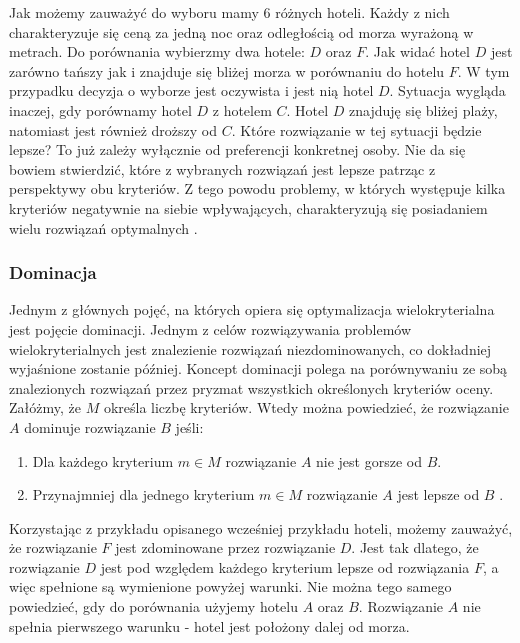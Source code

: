 \documentclass[twoside]{iisthesis}
\begin{document}
Jak możemy zauważyć do wyboru mamy 6 różnych hoteli. Każdy z nich charakteryzuje się ceną za jedną noc oraz odległością od morza wyrażoną w metrach. Do porównania wybierzmy dwa hotele: $D$ oraz $F$. Jak widać hotel $D$ jest zarówno tańszy jak i znajduje się bliżej morza w porównaniu do hotelu $F$. W tym przypadku decyzja o wyborze jest oczywista i jest nią hotel $D$. Sytuacja wygląda inaczej, gdy porównamy hotel $D$ z hotelem $C$. Hotel $D$ znajduję się bliżej plaży, natomiast jest również droższy od $C$. Które rozwiązanie w tej sytuacji będzie lepsze? To już zależy wyłącznie od preferencji konkretnej osoby. Nie da się bowiem stwierdzić, które z wybranych rozwiązań jest lepsze patrząc z perspektywy obu kryteriów. Z tego powodu problemy, w których występuje kilka kryteriów negatywnie na siebie wpływających, charakteryzują się posiadaniem wielu rozwiązań optymalnych \cite{book_ergot}.

\subsubsection{Dominacja}
Jednym z głównych pojęć, na których opiera się optymalizacja wielokryterialna jest pojęcie dominacji. Jednym z celów rozwiązywania problemów wielokryterialnych jest znalezienie rozwiązań niezdominowanych, co dokładniej wyjaśnione zostanie później. Koncept dominacji polega na porównywaniu ze sobą znalezionych rozwiązań przez pryzmat wszystkich określonych kryteriów oceny. Załóżmy, że $M$ określa liczbę kryteriów. Wtedy można powiedzieć, że rozwiązanie $A$ dominuje rozwiązanie $B$ jeśli:\\
\begin{enumerate}
	\item Dla każdego kryterium $m \in M$ rozwiązanie $A$ nie jest gorsze od $B$.
	\item Przynajmniej dla jednego kryterium $m \in M$ rozwiązanie $A$ jest lepsze od $B$ \cite{book}.\\
\end{enumerate}
Korzystając z przykładu opisanego wcześniej przykładu hoteli, możemy zauważyć, że rozwiązanie $F$ jest zdominowane przez rozwiązanie $D$. Jest tak dlatego, że rozwiązanie $D$ jest pod względem każdego kryterium lepsze od rozwiązania $F$, a więc spełnione są wymienione powyżej warunki. Nie można tego samego powiedzieć, gdy do porównania użyjemy hotelu $A$ oraz $B$. Rozwiązanie $A$ nie spełnia pierwszego warunku - hotel jest położony dalej od morza.
\end{document}
